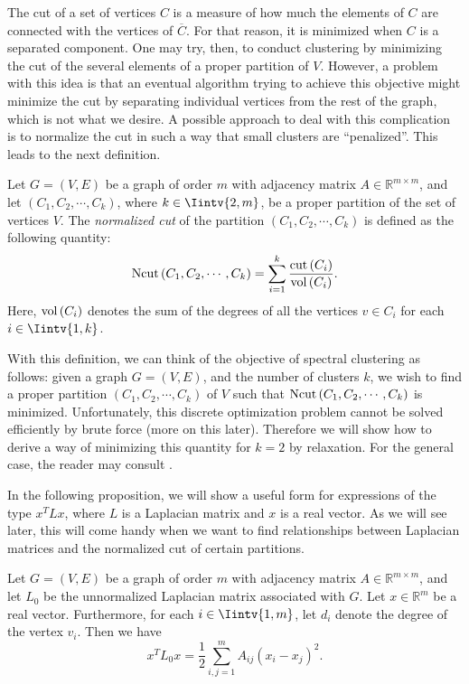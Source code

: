The cut of a set of vertices $C$ is a measure of how much the elements of $C$ are connected with the vertices of $\overline C$.
For that reason, it is minimized when $C$ is a separated component. 
One may try, then, to conduct clustering by minimizing the cut of the several elements of a proper partition of $V$.
However, a problem with this idea is that an eventual algorithm trying to achieve this objective might minimize the cut by separating individual vertices from the rest of the graph, which is not what we desire.
A possible approach to deal with this complication is to normalize the cut in such a way that small clusters are ``penalized''.
This leads to the next definition.

\begin{definition}
   Let $G = (V,E)$ be a graph of order $m$ with adjacency matrix $A \in \mathbb R^{m \times m}$, and let $(C_1, C_2, \cdots, C_k)$, where $k \in \Iintv{2,m}$, be a proper partition of the set of vertices $V$.
   The \textit{normalized cut} of the partition $(C_1, C_2, \cdots, C_k)$ is defined as the following quantity:
   \begin{equation}
      \operatorname*{Ncut\,} (C_1, C_2, \cdots, C_k) = \sum _{i = 1}^k \frac{\operatorname{cut\,} (C_i)}{\operatorname*{vol\,}(C_i)}.
   \end{equation}
   Here, $\operatorname*{vol\,} (C_i)$ denotes the sum of the degrees of all the vertices $v \in C_i$ for each $i \in \Iintv{1,k}$.
\end{definition}

With this definition, we can think of the objective of spectral clustering as follows: given a graph $G=(V,E)$, and the number of clusters $k$, we wish to find a proper partition $(C_1, C_2, \cdots, C_k)$ of $V$ such that $\operatorname*{Ncut\,} (C_1, C_2, \cdots, C_k)$ is minimized. Unfortunately, this discrete optimization problem cannot be solved efficiently by brute force (more on this later). Therefore we will show how to derive a way of minimizing this quantity for $k = 2$ by relaxation. For the general case, the reader may consult \cite{tutorial}.

In the following proposition, we will show a useful form for expressions of the type $x^TLx$, where $L$ is a Laplacian matrix and $x$ is a real vector.
As we will see later, this will come handy when we want to find relationships between Laplacian matrices and the normalized cut of certain partitions.

\begin{proposition}\label{xtlx}
   Let $G = (V,E)$ be a graph of order $m$ with adjacency matrix $A \in \mathbb R^{m \times m}$, and let $L_0$ be the unnormalized Laplacian matrix associated with $G$. Let $x \in \mathbb R^{m }$ be a real vector. Furthermore, for each $i \in \Iintv{1,m}$, let $d_i$ denote the degree of the vertex $v_i$. Then we have
   \begin{equation}
      x^TL_0x = \frac{1}{2}\sum_{i,j = 1}^m A_{ij} \left( x_i - x_j \right)^2.
   \end{equation}
\end{proposition}

